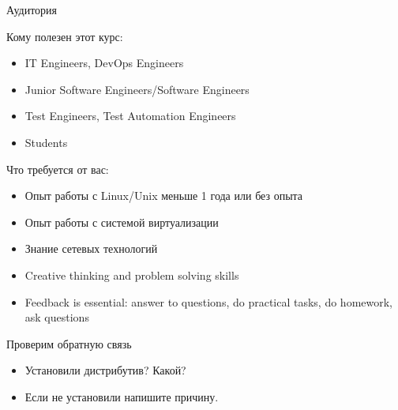 \begin{frame}{Аудитория}

Кому полезен этот курс:
\begin{itemize}
    \item IT Engineers, DevOps Engineers
    \item Junior Software Engineers/Software Engineers
    \item Test Engineers, Test Automation Engineers
    \item Students
\end{itemize}
    \pause
Что требуется от вас:
\begin{itemize}
    \item Опыт работы с Linux/Unix меньше 1 года или без опыта
    \pause
    \item Опыт работы с системой виртуализации
    \item Знание сетевых технологий
    \item Creative thinking and problem solving skills
    \pause
    \item \alert{Feedback is essential: answer to questions, do practical tasks, do homework, ask questions}
\end{itemize}
\end{frame}

\begin{frame}{Проверим обратную связь}
\begin{itemize}
    \item Установили дистрибутив? Какой?
    \item Если не установили напишите причину.
\end{itemize}
\end{frame}


